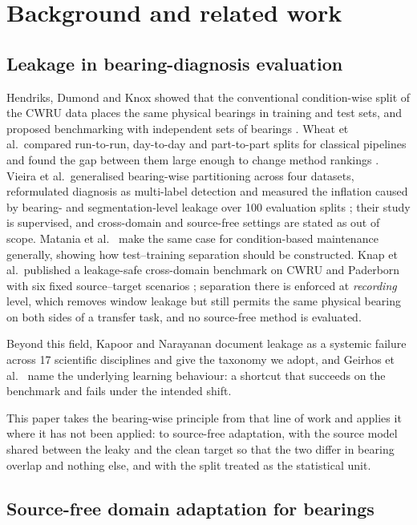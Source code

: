 \section{Background and related work}
\label{sec:background}

\subsection{Leakage in bearing-diagnosis evaluation}

Hendriks, Dumond and Knox showed that the conventional condition-wise split of the CWRU data places the same physical
bearings in training and test sets, and proposed benchmarking with independent sets of bearings \cite{hendriks2022}. Wheat et
al.\ compared run-to-run, day-to-day and part-to-part splits for classical pipelines and found the gap between them large
enough to change method rankings \cite{wheat2024leakage}. Vieira et al.\ generalised bearing-wise partitioning across four
datasets, reformulated diagnosis as multi-label detection and measured the inflation caused by bearing- and
segmentation-level leakage over 100 evaluation splits \cite{vieira2026}; their study is supervised, and cross-domain and
source-free settings are stated as out of scope. Matania et al.\ \cite{matania2024leakage} make the same case for
condition-based maintenance generally, showing how test--training separation should be constructed. Knap et al.\ published a
leakage-safe cross-domain benchmark on CWRU and Paderborn with six fixed source--target scenarios
\cite{knap2026leakagesafe}; separation there is enforced at
\emph{recording} level, which removes window leakage but still permits the same physical bearing on both sides of a transfer
task, and no source-free method is evaluated.

Beyond this field, Kapoor and Narayanan \cite{kapoor2023leakage} document leakage as a systemic failure across 17
scientific disciplines and give the taxonomy we adopt, and Geirhos et al.\ \cite{geirhos2020shortcut} name the underlying
learning behaviour: a shortcut that succeeds on the benchmark and fails under the intended shift.

This paper takes the bearing-wise principle from that line of work and applies it where it has not been applied: to
source-free adaptation, with the source model shared between the leaky and the clean target so that the two differ in
bearing overlap and nothing else, and with the split treated as the statistical unit.

\subsection{Source-free domain adaptation for bearings}

